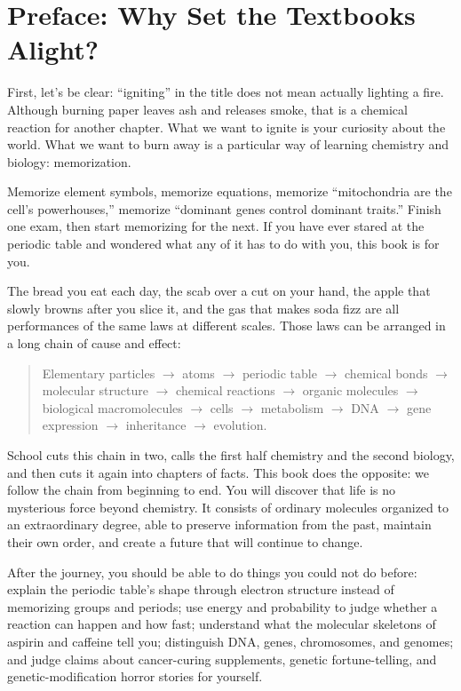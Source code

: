 \chapter*{Preface: Why Set the Textbooks Alight?}

First, let's be clear: ``igniting'' in the title does not mean actually lighting a fire. Although burning paper leaves ash and releases smoke, that is a chemical reaction for another chapter. What we want to ignite is your curiosity about the world. What we want to burn away is a particular way of learning chemistry and biology: memorization.

Memorize element symbols, memorize equations, memorize ``mitochondria are the cell's powerhouses,'' memorize ``dominant genes control dominant traits.'' Finish one exam, then start memorizing for the next. If you have ever stared at the periodic table and wondered what any of it has to do with you, this book is for you.

The bread you eat each day, the scab over a cut on your hand, the apple that slowly browns after you slice it, and the gas that makes soda fizz are all performances of the same laws at different scales. Those laws can be arranged in a long chain of cause and effect:

\begin{quote}
Elementary particles \(\rightarrow\) atoms \(\rightarrow\) periodic table \(\rightarrow\) chemical bonds \(\rightarrow\) molecular structure \(\rightarrow\) chemical reactions \(\rightarrow\) organic molecules \(\rightarrow\) biological macromolecules \(\rightarrow\) cells \(\rightarrow\) metabolism \(\rightarrow\) DNA \(\rightarrow\) gene expression \(\rightarrow\) inheritance \(\rightarrow\) evolution.
\end{quote}

School cuts this chain in two, calls the first half chemistry and the second biology, and then cuts it again into chapters of facts. This book does the opposite: we follow the chain from beginning to end. You will discover that life is no mysterious force beyond chemistry. It consists of ordinary molecules organized to an extraordinary degree, able to preserve information from the past, maintain their own order, and create a future that will continue to change.

After the journey, you should be able to do things you could not do before: explain the periodic table's shape through electron structure instead of memorizing groups and periods; use energy and probability to judge whether a reaction can happen and how fast; understand what the molecular skeletons of aspirin and caffeine tell you; distinguish DNA, genes, chromosomes, and genomes; and judge claims about cancer-curing supplements, genetic fortune-telling, and genetic-modification horror stories for yourself.

